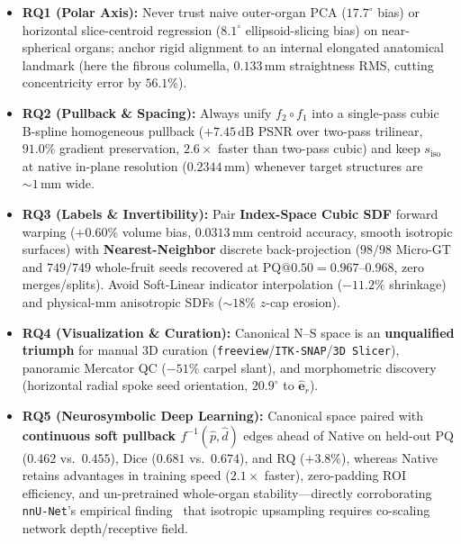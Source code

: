 \documentclass[10pt,a4paper]{article}
\renewcommand{\_}{\origunderscore\allowbreak}
\begin{document}
\begin{itemize}
    \item \textbf{RQ1 (Polar Axis):} Never trust naive outer-organ PCA ($17.7^\circ$ bias) or horizontal slice-centroid regression ($8.1^\circ$ ellipsoid-slicing bias) on near-spherical organs; anchor rigid alignment to an internal elongated anatomical landmark (here the fibrous columella, $0.133\,\text{mm}$ straightness RMS, cutting concentricity error by $56.1\%$).
    \item \textbf{RQ2 (Pullback \& Spacing):} Always unify $f_2 \circ f_1$ into a single-pass cubic B-spline homogeneous pullback ($+7.45\,\text{dB}$ PSNR over two-pass trilinear, $91.0\%$ gradient preservation, $2.6\times$ faster than two-pass cubic) and keep $s_{\text{iso}}$ at native in-plane resolution ($0.2344\,\text{mm}$) whenever target structures are $\sim 1\,\text{mm}$ wide.
    \item \textbf{RQ3 (Labels \& Invertibility):} Pair \textbf{Index-Space Cubic SDF} forward warping ($+0.60\%$ volume bias, $0.0313\,\text{mm}$ centroid accuracy, smooth isotropic surfaces) with \textbf{Nearest-Neighbor} discrete back-projection ($98/98$ Micro-GT and $749/749$ whole-fruit seeds recovered at $\text{PQ@0.50} = 0.967\text{--}0.968$, zero merges/splits). Avoid Soft-Linear indicator interpolation ($-11.2\%$ shrinkage) and physical-mm anisotropic SDFs ($\sim 18\%$ $z$-cap erosion).
    \item \textbf{RQ4 (Visualization \& Curation):} Canonical N--S space is an \textbf{unqualified triumph} for manual 3D curation (\texttt{freeview}/\texttt{ITK-SNAP}/\texttt{3D Slicer}), panoramic Mercator QC ($-51\%$ carpel slant), and morphometric discovery (horizontal radial spoke seed orientation, $20.9^\circ$ to $\hat{\mathbf{e}}_r$).
    \item \textbf{RQ5 (Neurosymbolic Deep Learning):} Canonical space paired with \textbf{continuous soft pullback $f^{-1}(\hat{p},\hat{d})$} edges ahead of Native on held-out $\text{PQ}$ ($0.462$ vs.\ $0.455$), $\text{Dice}$ ($0.681$ vs.\ $0.674$), and $\text{RQ}$ ($+3.8\%$), whereas Native retains advantages in training speed ($2.1\times$ faster), zero-padding ROI efficiency, and un-pretrained whole-organ stability---directly corroborating \texttt{nnU-Net}'s empirical finding~\cite{isensee2021nnunet} that isotropic upsampling requires co-scaling network depth/receptive field.
\end{itemize}
\end{document}

